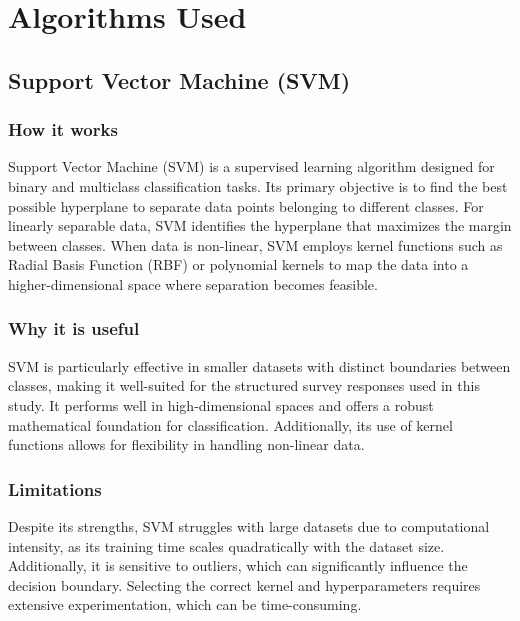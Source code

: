 \documentclass[runningheads,a4paper,11pt]{report}
\begin{document}
\section{Algorithms Used}
\label{section:algorithms_used}

\subsection{Support Vector Machine (SVM)}
\label{subsection:svm}

\subsubsection{How it works}
\label{subsubsection:svm_how_it_works}

Support Vector Machine (SVM) is a supervised learning algorithm designed for binary and multiclass classification tasks. Its primary objective is to find the best possible hyperplane to separate data points belonging to different classes. For linearly separable data, SVM identifies the hyperplane that maximizes the margin between classes. When data is non-linear, SVM employs kernel functions such as Radial Basis Function (RBF) or polynomial kernels to map the data into a higher-dimensional space where separation becomes feasible.

\subsubsection{Why it is useful}
\label{subsubsection:svm_why_useful}

SVM is particularly effective in smaller datasets with distinct boundaries between classes, making it well-suited for the structured survey responses used in this study. It performs well in high-dimensional spaces and offers a robust mathematical foundation for classification. Additionally, its use of kernel functions allows for flexibility in handling non-linear data.

\subsubsection{Limitations}
\label{subsubsection:svm_limitations}

Despite its strengths, SVM struggles with large datasets due to computational intensity, as its training time scales quadratically with the dataset size. Additionally, it is sensitive to outliers, which can significantly influence the decision boundary. Selecting the correct kernel and hyperparameters requires extensive experimentation, which can be time-consuming.
\end{document}
